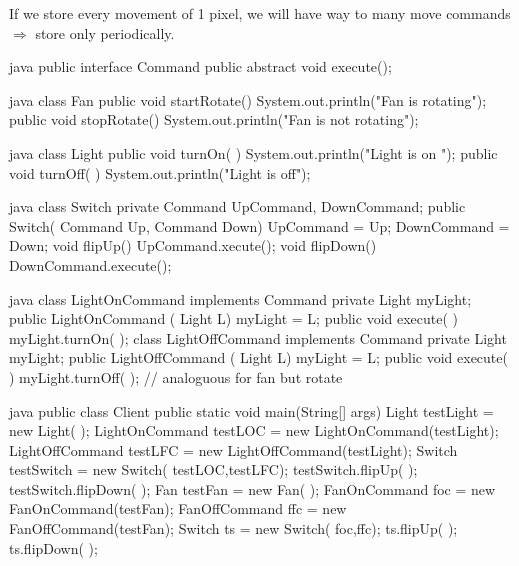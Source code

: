 \begin{notebox}[Problems]\nospacing
  If we store every movement of 1 pixel, we will have way to many move commands
  $\Rightarrow$ store only periodically.
\end{notebox}
\begin{codeboxNl}{java}
public interface Command {
    public abstract void execute();
}
\end{codeboxNl}
\begin{codeboxNl}{java}
class Fan {
  public void startRotate() {
          System.out.println("Fan is rotating");
  }
  public void stopRotate() {
          System.out.println("Fan is not rotating");
  }
}
\end{codeboxNl}
\begin{codeboxNl}{java}
class Light {
  public void turnOn( ) {
          System.out.println("Light is on ");
  }
  public void turnOff( ) {
          System.out.println("Light is off");
  }
}
\end{codeboxNl}
\begin{codeboxNl}[Invoker]{java}
 class Switch {
    private Command UpCommand, DownCommand;
    public Switch( Command Up, Command Down) {
        UpCommand = Up; 
        DownCommand = Down;
    }
    void flipUp(){ 
      UpCommand.xecute();                           
    }
    void flipDown(){
      DownCommand.execute();
    }
} 
\end{codeboxNl}
\begin{codeboxNl}{java}
class LightOnCommand implements Command {
  private Light myLight;
  public LightOnCommand ( Light L) {
          myLight  =  L;
  }
  public void execute( ) {
         myLight.turnOn( );
  }
}
class LightOffCommand implements Command {
  private Light myLight;
  public LightOffCommand ( Light L) {
          myLight  =  L;
  }
  public void execute( ) {
          myLight.turnOff( );
  }
}
// analoguous for fan but rotate
\end{codeboxNl}
\begin{codeboxNl}[Client]{java}
public class Client {
  public static void main(String[] args) {
    Light  testLight = new Light( );
    LightOnCommand testLOC = new LightOnCommand(testLight);
    LightOffCommand testLFC = new LightOffCommand(testLight);
    Switch testSwitch = new Switch( testLOC,testLFC);       
    testSwitch.flipUp( );
    testSwitch.flipDown( );
    Fan testFan = new Fan( );
    FanOnCommand foc = new FanOnCommand(testFan);
    FanOffCommand ffc = new FanOffCommand(testFan);
    Switch ts = new Switch( foc,ffc);
    ts.flipUp( );
    ts.flipDown( ); 
  }
}          
\end{codeboxNl}
